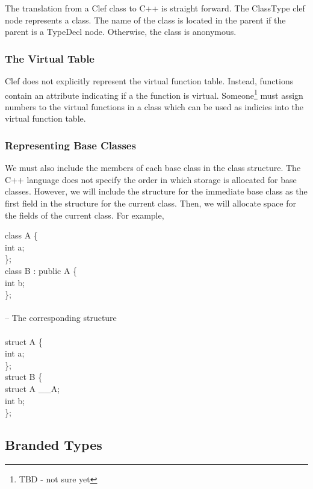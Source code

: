 The translation from a Clef class to C++ is straight forward.
The ClassType clef node represents a class.  The name
of the class is located in the parent if the parent is
a TypeDecl node.  Otherwise, the class is anonymous.

\subsubsection{The Virtual Table}

Clef does not explicitly represent the virtual function table.
Instead, functions contain an attribute indicating if a the function
is virtual.  Someone\footnote{TBD - not sure yet} must assign numbers
to the virtual functions in a class which can be used as indicies into
the virtual function table.

\subsubsection{Representing Base Classes}

We must also include the members of each base class in the class
structure.  The C++ language does not specify the order in which
storage is allocated for base classes\cite{ellis:90}.  However, we
will include the structure for the immediate base class as the first
field in the structure for the current class.  Then, we will allocate
space for the fields of the current class. For example,
\begin{codeseq}
class A \{ \\
\>int a;\\
\};\\
class B : public A \{\\
\>int b;\\
\};\\
\\
-- The corresponding structure\\
\\
struct A \{\\
\>int a;\\
\};\\
struct B \{\\
\>struct A \_\_A;\\
\>int b;\\
\};\\
\end{codeseq}

\subsection{Branded Types}

